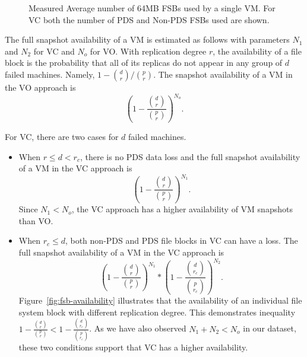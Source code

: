 \begin{figure}[htbp]
  \centering
  \caption{Measured Average number of 64MB FSBs used by a single VM. For VC both the number of PDS and Non-PDS FSBs used are shown.}
  \label{fig:vm-links}
\end{figure}

The full snapshot availability of a VM is estimated as follows with parameters $N_1$ and
 $N_2$ for VC and $N_o$ for VO.
With replication degree $r$, the availability of a file block is the probability that  
all of its replicas do not appear in any group of $d$ failed machines. 
Namely, $1-\binom{d}{r}/ \binom{p}{r}$. 
The snapshot availability of a VM  in the VO approach is
\begin{equation}
\label{eq:VO}
(1-\frac{ \binom{d}{r}} { \binom{p}{r} })^{N_o}. 
\end{equation}

For VC, there are two cases for $d$ failed machines.
\begin{itemize}
\item
When $r \le d<r_c$,  there is no PDS data loss and  
the full snapshot availability of a VM in the VC approach is 
\[
(1-\frac{\binom{d}{r}} { \binom{p}{r} })^{N_1}.
\]
Since $N_1 <N_o$, the VC approach has a higher availability of VM snapshots than VO.

\item
When $r_c \leq d$, both non-PDS and PDS file blocks in VC can have a loss.
The full snapshot availability of  a VM in the VC approach is
\[
(1-\frac{ \binom{d}{r}} { \binom{p}{r} })^{N_1} 
*
(1-\frac{ \binom{d}{r_c}} { \binom{p}{r_c} })^{N_2}.
\]
Figure~\ref{fig:fsb-availability} illustrates that the availability of an individual file system block
with different replication degree. This demonstrates inequality $1-\frac{ \binom{d}{r}} { \binom{p}{r} }
< 1-\frac{ \binom{d}{r_c}} { \binom{p}{r_c} }$. As we have also observed
$N_1+N_2 <N_o$ in our dataset, these two conditions support that VC has a  higher availability. 
\end{itemize} 

